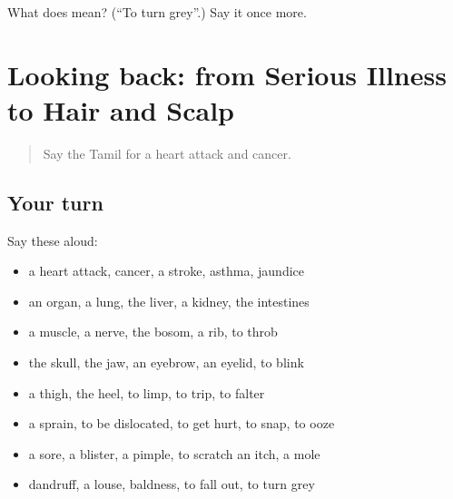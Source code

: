 \begin{tcolorbox}[breakable,colback=teal!4,colframe=teal!35!black,title={Before you move on}]
What does  mean? (\textquotedblleft{}To turn grey\textquotedblright{}.) Say it once more.
\end{tcolorbox}
\section[(dialogue)]{Looking back: from Serious Illness to Hair and Scalp}

\label{lesson:TA-R484-review-477-484}



\begin{quote}
Say the Tamil for a heart attack and cancer.
\end{quote}

\subsection*{Your turn}
Say these aloud:

\begin{itemize}
\raggedright
  \item a heart attack, cancer, a stroke, asthma, jaundice
  \item an organ, a lung, the liver, a kidney, the intestines
  \item a muscle, a nerve, the bosom, a rib, to throb
  \item the skull, the jaw, an eyebrow, an eyelid, to blink
  \item a thigh, the heel, to limp, to trip, to falter
  \item a sprain, to be dislocated, to get hurt, to snap, to ooze
  \item a sore, a blister, a pimple, to scratch an itch, a mole
  \item dandruff, a louse, baldness, to fall out, to turn grey
\end{itemize}

